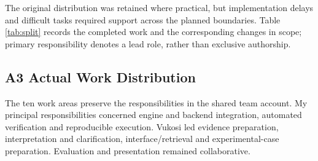 The original distribution was retained where practical, but implementation delays and difficult tasks required support across the planned boundaries. Table \ref{tab:split} records the completed work and the corresponding changes in scope; primary responsibility denotes a lead role, rather than exclusive authorship.

\subsection*{A3 Actual Work Distribution}
The ten work areas preserve the responsibilities in the shared team account. My principal responsibilities concerned engine and backend integration, automated verification and reproducible execution. Vukosi led evidence preparation, interpretation and clarification, interface/retrieval and experimental-case preparation. Evaluation and presentation remained collaborative.
\newpage
\setcounter{table}{2}
